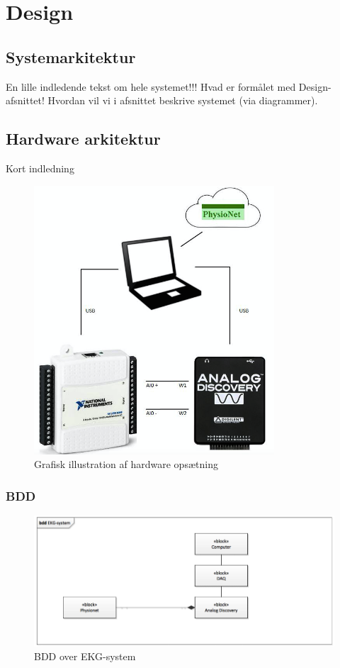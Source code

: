 \chapter{Design}

\section{Systemarkitektur}
En lille indledende tekst om hele systemet!!! Hvad er formålet med Design-afsnittet! Hvordan vil vi i afsnittet beskrive systemet (via diagrammer). 

\section{Hardware arkitektur}
Kort indledning 

\begin{figure}[H]
	\centering
	\includegraphics[width=0.8\textwidth]{Figurer/Snip20150427_1}
	\caption{Grafisk illustration af hardware opsætning}
\end{figure}

\subsection{BDD}

\begin{figure}[H]
	\centering
	\includegraphics[width=1\textwidth]{Figurer/Snip20150427_2}
	\caption{BDD over EKG-system}
\end{figure}

